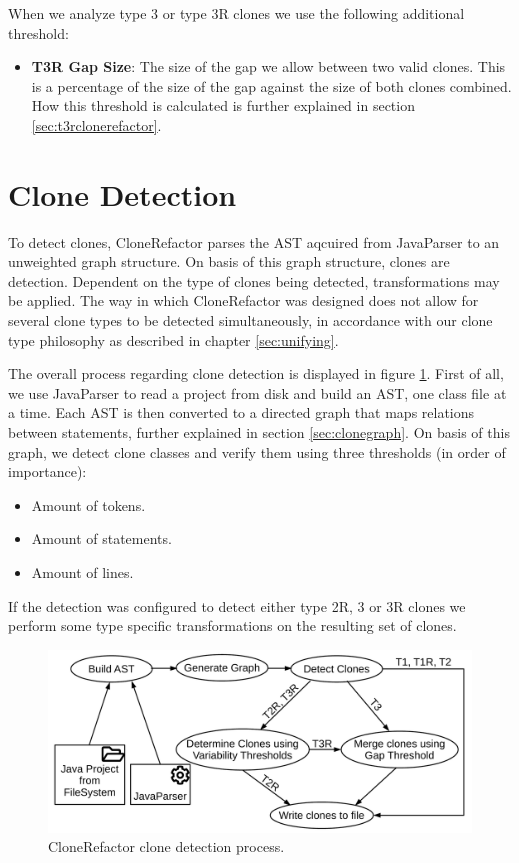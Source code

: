 When we analyze type 3 or type 3R clones we use the following additional threshold:
\begin{itemize}
  \item \textbf{T3R Gap Size}: The size of the gap we allow between two valid clones. This is a percentage of the size of the gap against the size of both clones combined. How this threshold is calculated is further explained in section \ref{sec:t3rclonerefactor}.
\end{itemize}

\section{Clone Detection}\label{sec:clonedetection}
To detect clones, CloneRefactor parses the AST aqcuired from JavaParser to an unweighted graph structure. On basis of this graph structure, clones are detection. Dependent on the type of clones being detected, transformations may be applied. The way in which CloneRefactor was designed does not allow for several clone types to be detected simultaneously, in accordance with our clone type philosophy as described in chapter \ref{sec:unifying}.

The overall process regarding clone detection is displayed in figure \ref{fig:clonedetection}. First of all, we use JavaParser to read a project from disk and build an AST, one class file at a time. Each AST is then converted to a directed graph that maps relations between statements, further explained in section \ref{sec:clonegraph}. On basis of this graph, we detect clone classes and verify them using three thresholds (in order of importance):
\begin{itemize}
  \item Amount of tokens.
  \item Amount of statements.
  \item Amount of lines.
\end{itemize}
If the detection was configured to detect either type 2R, 3 or 3R clones we perform some type specific transformations on the resulting set of clones.

\begin{figure}[H]
  \centering
  \includegraphics[width=1\columnwidth]{img/CloneDetection}
  \caption{CloneRefactor clone detection process.}
  \label{fig:clonedetection}
\end{figure}

